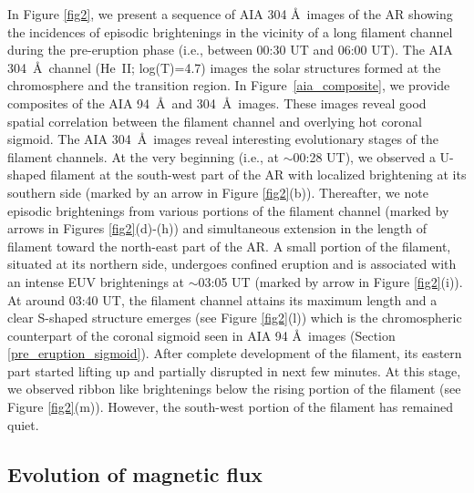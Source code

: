 \documentclass[twocolumn]{aastex6}
\begin{document}
In Figure \ref{fig2}, we present a sequence of AIA 304 \AA~images of the AR showing the incidences of episodic brightenings in the vicinity of a long filament channel during the pre-eruption phase (i.e., between 00:30 UT and 06:00 UT). The AIA 304~\AA~channel (He~{\footnotesize II}; log(T)=4.7) images the solar structures formed at the chromosphere and the transition region. In Figure~\ref{aia_composite}, we provide composites of the AIA 94~\AA~and 304~\AA~images. These images reveal good spatial correlation between the filament channel and overlying hot coronal sigmoid. The AIA 304~\AA~images reveal interesting evolutionary stages of the filament channels. At the very beginning (i.e., at $\sim$00:28 UT), we observed a U-shaped filament at the south-west part of the AR with localized brightening at its southern side (marked by an arrow in Figure \ref{fig2}(b)). Thereafter, we note episodic brightenings from various portions of the filament channel (marked by arrows in Figures \ref{fig2}(d)-(h)) and simultaneous extension in the length of filament toward the north-east part of the AR. A small portion of the filament, situated at its northern side, undergoes confined eruption and is associated with an intense EUV brightenings at $ \sim $03:05 UT (marked by arrow in Figure \ref{fig2}(i)). At around 03:40 UT, the filament channel attains its maximum length and a clear S-shaped structure emerges (see Figure \ref{fig2}(l)) which is the chromospheric counterpart of the coronal sigmoid seen in AIA 94 \AA~images (Section \ref{pre_eruption_sigmoid}). After complete development of the filament, its eastern part started lifting up and partially disrupted in next few minutes. At this stage, we observed ribbon like brightenings below the rising portion of the filament (see Figure \ref{fig2}(m)). However, the south-west portion of the filament has remained quiet. 

\subsection{Evolution of magnetic flux}
\label{sec_flux_evolution}
\end{document}
